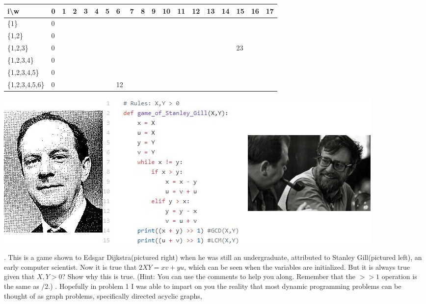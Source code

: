 \documentclass[12pt]{article}
\begin{document}
\FloatBarrier
\begin{table}[]
    \begin{tabular}{|l|l|l|l|l|l|l|l|l|l|l|l|l|l|l|l|l|l|l|}
    \hline
    i\textbackslash{}w & 0 & 1 & 2 & 3 & 4 & 5 & 6  & 7 & 8 & 9 & 10 & 11 & 12 & 13 & 14 & 15 & 16 & 17 \\ \hline
    \{1\}                  & 0 &   &   &   &   &   &    &   &   &   &    &    &    &    &    &    &    &    \\ \hline
    \{1,2\}                  & 0 &   &   &   &   &   &    &   &   &   &    &    &    &    &    &    &    &    \\ \hline
    \{1,2,3\}                  & 0 &   &   &   &   &   &    &   &   &   &    &    &    &    &    & 23 &    &    \\ \hline
    \{1,2,3,4\}                  & 0 &   &   &   &   &   &    &   &   &   &    &    &    &    &    &    &    &    \\ \hline
    \{1,2,3,4,5\}                  & 0 &   &   &   &   &   &    &   &   &   &    &    &    &    &    &    &    &    \\ \hline
    \{1,2,3,4,5,6\}                  & 0 &   &   &   &   &   & 12 &   &   &   &    &    &    &    &    &    &    &    \\ \hline
    \end{tabular}
    \end{table}
    \FloatBarrier
\newpage
\centerline{\includegraphics[scale = 2]{comb.jpg}}
. This is a game shown to Edsgar Dijkstra(pictured right) when he was still an undergraduate, attributed to Stanley Gill(pictured left), an early computer scientist. Now it is true that $2XY = xv+yu$, which can be seen when the variables are initialized. But it is always true given that $X,Y > 0$? Show why this is true. (Hint: You can use the comments to help you along. Remember that the $>> 1 $ operation is the same as $ / 2$.)
\newpage
{}. Hopefully in problem 1 I was able to impart on you the reality that most dynamic 
programming problems can be thought of as graph problems, specifically directed acyclic graphs, 
\end{document}
